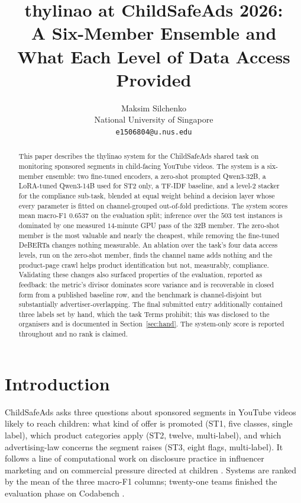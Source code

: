 \documentclass[11pt]{article}
\title{thylinao at ChildSafeAds 2026:\\A Six-Member Ensemble and What Each Level of Data Access Provided}
\author{Maksim Silchenko \\
  National University of Singapore \\
  \texttt{e1506804@u.nus.edu}}
\begin{document}
\maketitle

\begin{abstract}
This paper describes the thylinao system for the ChildSafeAds shared task on monitoring
sponsored segments in child-facing YouTube videos. The system is a six-member ensemble: two
fine-tuned encoders, a zero-shot prompted Qwen3-32B, a LoRA-tuned Qwen3-14B used for ST2 only,
a TF-IDF baseline, and a level-2 stacker for the compliance sub-task, blended at equal weight
behind a decision layer whose every parameter is fitted on channel-grouped out-of-fold
predictions. The system scores mean macro-F1 $0.6537$ on the evaluation split; inference over
the $503$ test instances is dominated by one measured $14$-minute GPU pass of the 32B member.
The zero-shot
member is the most valuable and nearly the cheapest, while removing the fine-tuned DeBERTa
changes nothing measurable. An ablation over the task's four data access levels, run on the
zero-shot member, finds the channel name adds nothing and the product-page crawl helps product
identification but not, measurably, compliance. Validating these changes also
surfaced properties of the evaluation, reported as feedback: the metric's divisor dominates
score variance and is recoverable in closed form from a published baseline row, and the
benchmark is channel-disjoint but substantially advertiser-overlapping. The final submitted
entry additionally contained three labels set by
hand, which the task Terms prohibit; this was disclosed to the organisers and is documented in
Section~\ref{sec:hand}. The system-only score is reported throughout and no rank is claimed.
\end{abstract}

\section{Introduction}

ChildSafeAds \cite{bertaglia2026childsafeads} asks three questions about sponsored segments in
YouTube videos likely to reach children: what kind of offer is promoted (ST1, five classes,
single label), which product categories apply (ST2, twelve, multi-label), and which
advertising-law concerns the segment raises (ST3, eight flags, multi-label). It follows a line of
computational work on disclosure practice in influencer marketing \cite{mathur2018endorsements,%
bertaglia2025selfdisclosure} and on commercial pressure directed at children
\cite{deveirman2019influencer,moti2024targeted}. Systems are ranked by the mean of the three
macro-F1 columns; twenty-one teams finished the evaluation phase on Codabench
\cite{xu2022codabench}.
\end{document}
